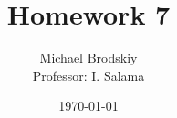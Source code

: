


\title{Homework 7}
\date{\today}
\author{Michael Brodskiy\\ \small Professor: I. Salama}



\maketitle


